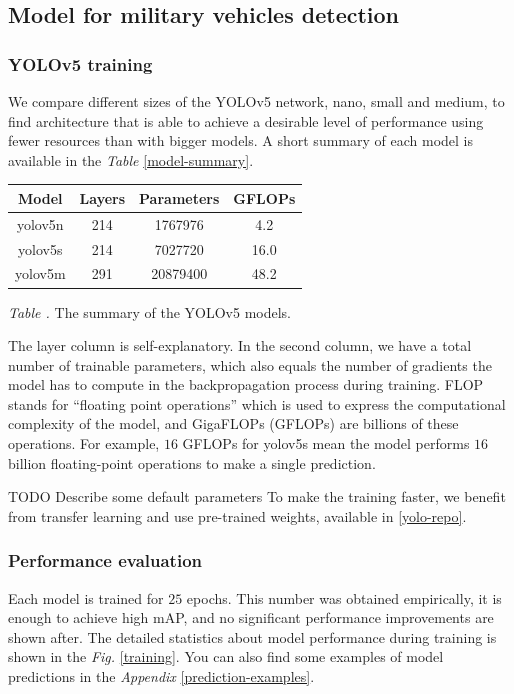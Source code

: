 \documentclass[14pt,a4paper]{extarticle}
\newcounter{e}
\newcounter{tabl}
\newcommand{\tabl}[1]{\refstepcounter{tabl} \vspace{-0.3cm}\textit{Table \arabic{tabl}\label{#1}.}}
\numberwithin{equation}{section}
\numberwithin{figure}{section}
\begin{document}
\subsection{Model for military vehicles detection}
\subsubsection{YOLOv5 training}

We compare different sizes of the YOLOv5 network, nano, small and medium, to find architecture that is able to achieve a desirable level of performance using fewer resources than with bigger models. A short summary of each model is available in the \textit{Table} \ref{model-summary}.
\begin{center}
    \begin{tabular}{|c|c|c|c|}
        \hline
        Model
        & Layers
        & Parameters
        & GFLOPs
        \\ \hline
        yolov5n
        & 214
        & 1767976
        & 4.2
        \\ \hline
        yolov5s
        & 214
        & 7027720
        & 16.0
        \\ \hline
        yolov5m
        & 291
        & 20879400
        & 48.2
        \\ \hline
    \end{tabular}
\end{center}
\begin{center}
    \tabl{model-summary} The summary of the YOLOv5 models.
\end{center}

The layer column is self-explanatory. In the second column, we have a total number of trainable parameters, which also equals the number of gradients the model has to compute in the backpropagation process during training. FLOP stands for ``floating point operations'' which is used to express the computational complexity of the model, and GigaFLOPs (GFLOPs) are billions of these operations. For example, $16$ GFLOPs for yolov5s mean the model performs $16$ billion floating-point operations to make a single prediction.

TODO Describe some default parameters
To make the training faster, we benefit from transfer learning and use pre-trained weights, available in \ref{yolo-repo}.

\subsubsection{Performance evaluation}
Each model is trained for $25$ epochs. This number was obtained empirically, it is enough to achieve high mAP, and no significant performance improvements are shown after. The detailed statistics about model performance during training is shown in the \textit{Fig.} \ref{training}. You can also find some examples of model predictions in the \textit{Appendix} \ref{prediction-examples}.
\end{document}
